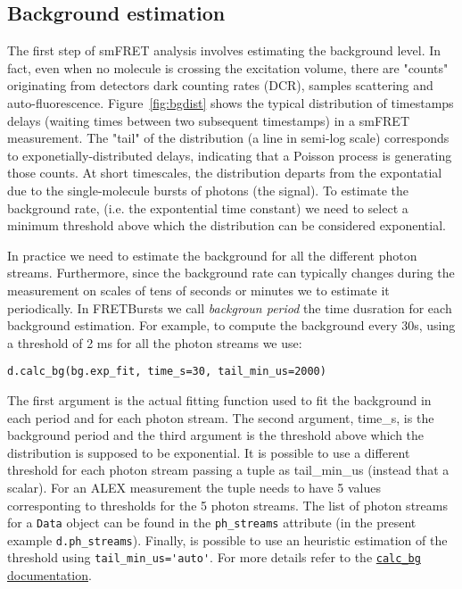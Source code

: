 \subsection{Background estimation}

The first step of smFRET analysis involves estimating the background level. In fact,  even when no molecule is crossing the excitation volume, there are "counts" originating from detectors dark counting rates (DCR), samples scattering and auto-fluorescence. Figure~\ref{fig:bgdist} shows the typical distribution of timestamps delays (waiting times between two subsequent timestamps) in a smFRET measurement. The "tail" of the distribution (a line in semi-log scale) corresponds to exponetially-distributed delays, indicating that a Poisson process is generating those counts. At short timescales, the distribution departs from the expontatial due to the single-molecule bursts of photons (the signal).
To estimate the background rate, (i.e. the expontential time constant) we need to select a minimum threshold above which the distribution can be considered exponential. 

In practice we need to estimate the background for all the different photon streams. Furthermore, since the background rate can typically changes during the measurement on scales of tens of seconds or minutes we to estimate it periodically. 
In FRETBursts we call \textit{backgroun period} the time dusration for each background estimation. For example, to compute the background every 30s, using a threshold of 2 ms for all the photon streams we use:

\verb|d.calc_bg(bg.exp_fit, time_s=30, tail_min_us=2000)|

The first argument is the actual fitting function used to fit the background in each period and for each photon stream. The second argument, time_s, is the background period and the third argument is the threshold above which the distribution is supposed to be exponential. It is possible to use a different threshold for each photon stream passing a tuple as tail_min_us (instead that a scalar). For an ALEX measurement the tuple needs to have 5 values corresponting to thresholds for the 5 photon streams. The list of photon streams for a \verb|Data| object can be found in the \verb|ph_streams| attribute (in the present example \verb|d.ph_streams|). Finally, is possible to use an heuristic estimation of the threshold using \verb|tail_min_us='auto'|. For more details refer to the \href{http://fretbursts.readthedocs.org/en/latest/data_class.html#fretbursts.burstlib.Data.calc_bg}{\verb|calc_bg| documentation}.

